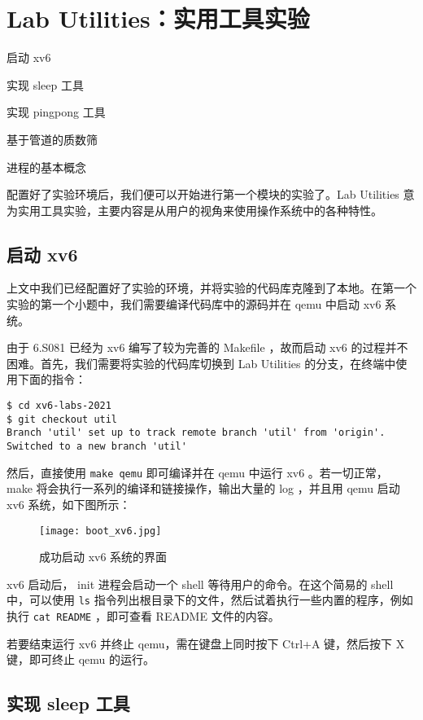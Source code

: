 \chapter{Lab Utilities：实用工具实验}
\begin{introduction}
    \item 启动 xv6
    \item 实现 sleep 工具
    \item 实现 pingpong 工具
    \item 基于管道的质数筛
    \item 进程的基本概念
\end{introduction}

配置好了实验环境后，我们便可以开始进行第一个模块的实验了。Lab Utilities 意为实用工具实验，主要内容是从用户的视角来使用操作系统中的各种特性。

\section{启动 xv6}

上文中我们已经配置好了实验的环境，并将实验的代码库克隆到了本地。在第一个实验的第一个小题中，我们需要编译代码库中的源码并在 qemu 中启动 xv6 系统。

由于 6.S081 已经为 xv6 编写了较为完善的 Makefile ，故而启动 xv6 的过程并不困难。首先，我们需要将实验的代码库切换到 Lab Utilities 的分支，在终端中使用下面的指令：
\begin{lstlisting}
$ cd xv6-labs-2021
$ git checkout util
Branch 'util' set up to track remote branch 'util' from 'origin'.
Switched to a new branch 'util'
\end{lstlisting}
然后，直接使用 \lstinline{make qemu} 即可编译并在 qemu 中运行 xv6 。若一切正常， make 将会执行一系列的编译和链接操作，输出大量的 log ，并且用 qemu 启动 xv6 系统，如下图所示：
\begin{figure}[H]
  \centering
  \texttt{[image: boot\_xv6.jpg]}
  \caption{成功启动 xv6 系统的界面}
\end{figure}
xv6 启动后， init 进程会启动一个 shell 等待用户的命令。在这个简易的 shell 中，可以使用 \lstinline{ls} 指令列出根目录下的文件，然后试着执行一些内置的程序，例如执行 \lstinline{cat README} ，即可查看 README 文件的内容。

若要结束运行 xv6 并终止 qemu，需在键盘上同时按下 Ctrl+A 键，然后按下 X 键，即可终止 qemu 的运行。

\section{实现 sleep 工具}

